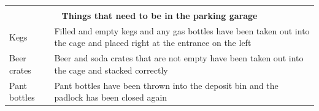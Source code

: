 \documentclass[a4paper,10pt,oneside,article]{memoir}
\begin{document}
\vspace{0.5cm}
\noindent
\begin{tabular}{|l|l|}
    \hline
    \multicolumn{2}{|c|}{} \\
    \multicolumn{2}{|c|}{\Large \textbf{Things that need to be in the parking garage}} \\
    \hline
    \begin{minipage}[t]{0.15\textwidth}
        Kegs
    \end{minipage} & 
    \begin{minipage}[t]{0.80\textwidth}
        Filled and empty kegs and any gas bottles have been taken out into the cage and
        placed right at the entrance on the left
    \end{minipage} \\
    \hline
    \begin{minipage}[t]{0.15\textwidth}
        Beer crates
    \end{minipage} & 
    \begin{minipage}[t]{0.80\textwidth}
        Beer and soda crates that are not empty have been taken out into the cage and stacked correctly
    \end{minipage} \\
    \hline
    \begin{minipage}[t]{0.15\textwidth}
        Pant bottles
    \end{minipage} & 
    \begin{minipage}[t]{0.80\textwidth}
        Pant bottles have been thrown into the deposit bin and the padlock has been closed again
    \end{minipage} \\
    \hline
\end{tabular}
\end{document}
